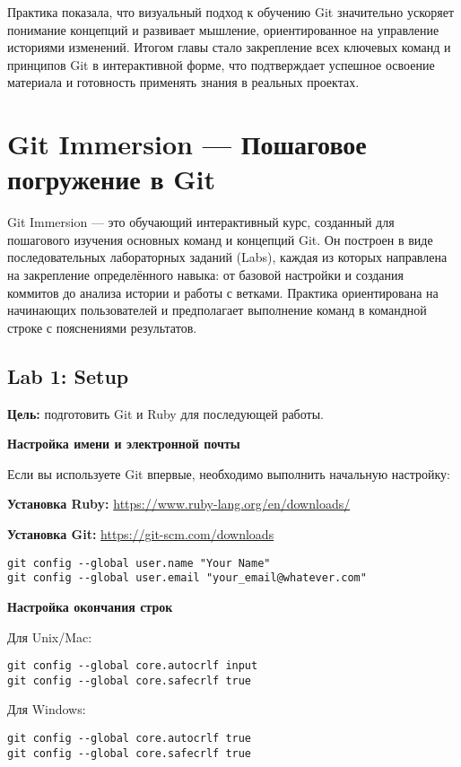 \documentclass[a4paper,12pt]{report}
\begin{document}
Практика показала, что визуальный подход к обучению Git значительно ускоряет понимание концепций и развивает мышление, ориентированное на управление историями изменений. Итогом главы стало закрепление всех ключевых команд и принципов Git в интерактивной форме, что подтверждает успешное освоение материала и готовность применять знания в реальных проектах.


\chapter{Git Immersion — Пошаговое погружение в Git}\label{git_immersive_practice}

Git Immersion — это обучающий интерактивный курс, созданный для пошагового изучения основных команд и концепций Git. Он построен в виде последовательных лабораторных заданий (Labs), каждая из которых направлена на закрепление определённого навыка: от базовой настройки и создания коммитов до анализа истории и работы с ветками. Практика ориентирована на начинающих пользователей и предполагает выполнение команд в командной строке с пояснениями результатов.

\section{Lab 1: Setup}
\textbf{Цель:} подготовить Git и Ruby для последующей работы.

\textbf{Настройка имени и электронной почты}

Если вы используете Git впервые, необходимо выполнить начальную настройку:

\textbf{Установка Ruby:} \url{https://www.ruby-lang.org/en/downloads/}

\textbf{Установка Git:} \url{https://git-scm.com/downloads}

\begin{verbatim}
git config --global user.name "Your Name"
git config --global user.email "your_email@whatever.com"
\end{verbatim}

\textbf{Настройка окончания строк}

Для Unix/Mac:
\begin{verbatim}
git config --global core.autocrlf input
git config --global core.safecrlf true
\end{verbatim}

Для Windows:
\begin{verbatim}
git config --global core.autocrlf true
git config --global core.safecrlf true
\end{verbatim}
\end{document}
